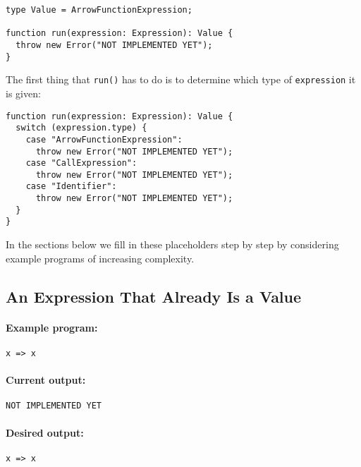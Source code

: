 \documentclass[12pt, oneside]{book}
\begin{document}
\begin{verbatim}
type Value = ArrowFunctionExpression;

function run(expression: Expression): Value {
  throw new Error("NOT IMPLEMENTED YET");
}
\end{verbatim}

The first thing that \texttt{run()} has to do is to determine which type of \texttt{expression} it is given:

\begin{verbatim}
function run(expression: Expression): Value {
  switch (expression.type) {
    case "ArrowFunctionExpression":
      throw new Error("NOT IMPLEMENTED YET");
    case "CallExpression":
      throw new Error("NOT IMPLEMENTED YET");
    case "Identifier":
      throw new Error("NOT IMPLEMENTED YET");
  }
}
\end{verbatim}

In the sections below we fill in these placeholders step by step by considering example programs of increasing complexity.

\subsection{An Expression That Already Is a Value}

\paragraph{Example program:}

\begin{verbatim}
x => x
\end{verbatim}

\paragraph{Current output:}

\begin{verbatim}
NOT IMPLEMENTED YET
\end{verbatim}

\paragraph{Desired output:}

\begin{verbatim}
x => x
\end{verbatim}

\paragraph{}
\end{document}
